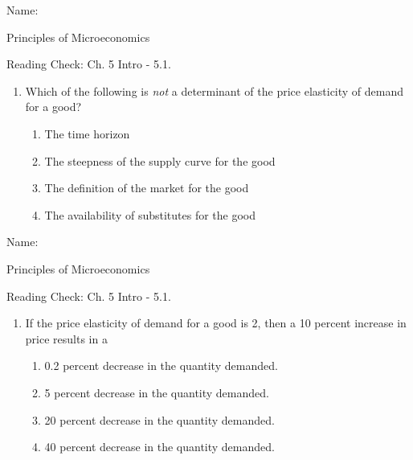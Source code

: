 \documentclass{article}
\begin{document}
Name: \underline{\phantom{xxxxxxxxxxxxxxxxxxxxxxxxxxxxxxxxxxxxxxxx}}

Principles of Microeconomics

Reading Check: Ch. 5 Intro - 5.1.

\begin{enumerate}

\item Which of the following is \textit{not} a determinant of the price elasticity of demand for a good?

	\begin{enumerate}
	
	\item The time horizon
	
	\item The steepness of the supply curve for the good
	
	\item The definition of the market for the good
	
	\item The availability of substitutes for the good
	
	\end{enumerate}
	
\end{enumerate}

\bigskip

Name: \underline{\phantom{xxxxxxxxxxxxxxxxxxxxxxxxxxxxxxxxxxxxxxxx}}

Principles of Microeconomics

Reading Check: Ch. 5 Intro - 5.1.

\begin{enumerate}

\item If the price elasticity of demand for a good is 2, then a 10 percent increase in price results in a

	\begin{enumerate}
	
	\item 0.2 percent decrease in the quantity demanded.
	
	\item 5 percent decrease in the quantity demanded.
	
	\item 20 percent decrease in the quantity demanded.
	
	\item 40 percent decrease in the quantity demanded.
	
	\end{enumerate}
	
\end{enumerate}
\end{document}
